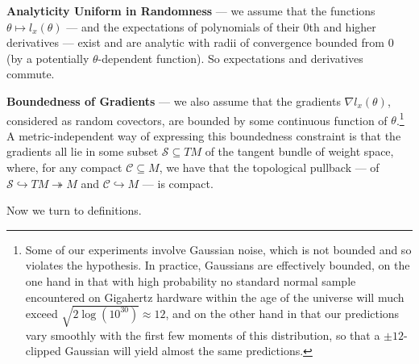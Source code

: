 \documentclass[openany, notitlepage, justified]{tufte-book}
\theoremstyle{plain}
\theoremstyle{definition}
\newcommand{\Cc}{\mathcal{C}}   \newcommand{\CC}{\mathbb{C}}
\newcommand{\Ss}{\mathcal{S}}
\begin{document}
        \textbf{Analyticity Uniform in Randomness} --- we assume that
        the functions $\theta \mapsto l_x(\theta)$ --- and the expectations
        of polynomials of their $0$th and higher derivatives --- exist and are
        analytic with radii of convergence bounded from $0$ (by a potentially
        $\theta$-dependent function).  So expectations and derivatives commute. 

        \textbf{Boundedness of Gradients} --- we also assume that the gradients
        $\nabla l_x(\theta)$, considered as random covectors, are bounded by
        some continuous function of $\theta$.\footnote{
            Some of our experiments involve Gaussian noise, which is not
            bounded and so violates the hypothesis.  In practice, Gaussians are
            effectively bounded, on the one hand in that with high
            probability no standard normal sample encountered on Gigahertz
            hardware within the age of the universe will much exceed $\sqrt{2
            \log(10^{30})} \approx 12$, and on the other hand in that
            our predictions vary smoothly with the first few moments of this
            distribution, so that a $\pm 12$-clipped Gaussian will yield almost
            the same predictions.
        }
        A metric-independent way of expressing this boundedness constraint
        is that the gradients all lie in some subset $\Ss \subseteq TM$ of
        the tangent bundle of weight space, where, for any compact $\Cc
        \subseteq M$, we have that the topological pullback --- of
        $\Ss \hookrightarrow TM \twoheadrightarrow M$
        and
        $\Cc \hookrightarrow M$ ---
        is compact.
        
        Now we turn to definitions.
\end{document}

